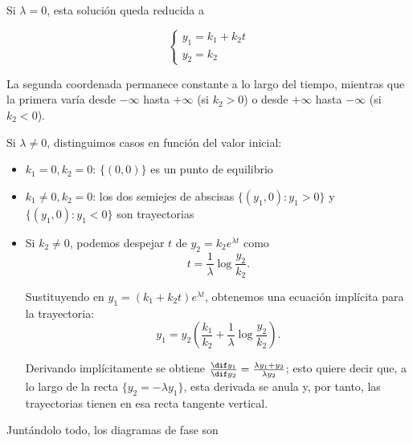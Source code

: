 \documentclass[../main.tex]{subfiles}
\begin{document}
Si \(\lambda = 0\), esta solución queda reducida a

\[
  \begin{cases}
    y_1 = k_1 + k_2 t \\
    y_2 = k_2
  \end{cases}
\]

La segunda coordenada permanece constante a lo largo del tiempo, mientras que la
primera varía desde \(-\infty\) hasta \(+\infty\) (si \(k_2 > 0\)) o desde
\(+\infty\) hasta \(-\infty\) (si \(k_2 < 0\)).

Si \(\lambda \neq 0\), distinguimos casos en función del valor inicial:

\begin{itemize}
\item \(k_1 = 0, k_2 = 0\): \(\{(0,0)\}\) es un punto de equilibrio
\item \(k_1 \neq 0, k_2 = 0\): los dos semiejes de abscisas
  \(\{(y_1, 0) : y_1 > 0\}\) y \(\{(y_1,0) : y_1 < 0\}\) son trayectorias
\item Si \(k_2 \neq 0\), podemos despejar \(t\) de \(y_2 = k_2e^{\lambda t}\) como
  \[t = \frac{1}{\lambda} \log \frac{y_2}{k_2}.\]

  Sustituyendo en \(y_1 = (k_1 + k_2t)e^{\lambda t}\), obtenemos una ecuación
  implícita para la trayectoria:
  \[y_1 = y_2 \left( \frac{k_1}{k_2} + \frac{1}{\lambda} \log \frac{y_2}{k_2}
    \right).\]

  Derivando implícitamente se obtiene
  \(\frac{\dif y_1}{\dif y_2} = \frac{\lambda y_1 + y_2}{\lambda y_2}\); esto
  quiere decir que, a lo largo de la recta \(\{y_2 = -\lambda y_1\}\), esta
  derivada se anula y, por tanto, las trayectorias tienen en esa recta tangente
  vertical.
\end{itemize}

Juntándolo todo, los diagramas de fase son
\end{document}
